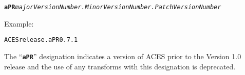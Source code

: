 \texttt{\textbf{aPR}\textit{majorVersionNumber.MinorVersionNumber.PatchVersionNumber}}

Example:
\begin{listize}
	\item \texttt{ACESrelease.aPR0.7.1}
\end{listize}

The ``\texttt{\textbf{aPR}}'' designation indicates a version of ACES prior to the Version 1.0 release and the use of any transforms with this designation is deprecated.